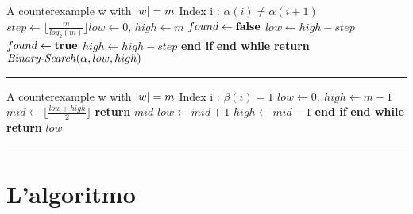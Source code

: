 \noindent

\begin{minipage}{0.48\textwidth}
\captionsetup{format=ruled,labelfont=bf}
 \label{alg:par}
   
    \begin{algorithmic}[0]
    \small
\Statex
\Input A counterexample w with $\lvert w\rvert=m$
\Output Index i : $\alpha(i) \neq \alpha(i+1)$
\State $step \gets \lfloor \frac{m}{log_{2}(m)} \rfloor low \gets 0,\, high \gets m$
\State $found \gets \text{\textbf{false}}$
\State $low \gets high-step$
\State $found \gets \text{\textbf{true}}$
\State {}
\Else
\State $high \gets high-step$
\EndIf
\EndWhile
\State \textbf{\quad\:\:end if}
\State \textbf{end while}
\State \textbf{return} $\text{\textit{Binary-Search}}(\alpha,low,high)$


\end{algorithmic}

  \kern2pt\hrule height.8pt\relax
\end{minipage}%
\hfill
\begin{minipage}{0.50\textwidth}
\captionsetup{format=ruled,labelfont=bf}
  \label{alg:eag}
  
    
    \begin{algorithmic}[0]
     \small
\Statex
\Input A counterexample w with $\lvert w\rvert=m$
\Output Index i : $\beta(i)=1$
\State $low \gets 0,\: high \gets m-1$
\State $mid\gets \lfloor \frac {low+high}{2} \rfloor$
\State \textbf{return} $mid$
\State $low \gets mid+1$
\Else
\State $high \gets mid-1$
\EndIf
\EndWhile
\State \textbf{\quad\:\:end if}
\State \textbf{end while}
\State \textbf{return} $low$
\end{algorithmic}
  
  \kern2pt\hrule height.8pt\relax
\end{minipage}
\section{L'algoritmo}
\label{sec:alobp}
